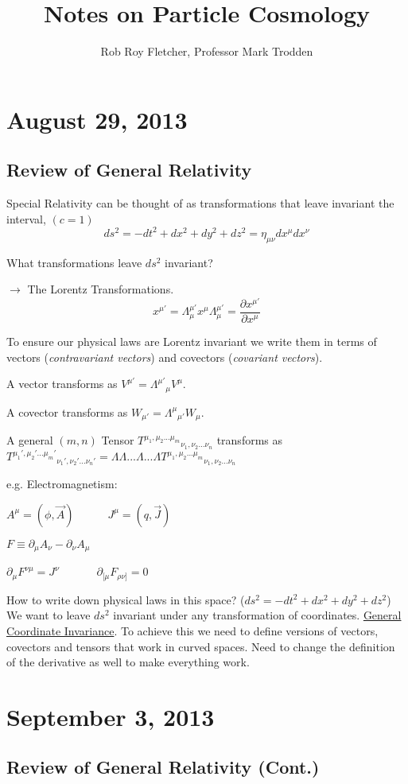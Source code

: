\documentclass{article}
\title{Notes on Particle Cosmology}
\author{Rob Roy Fletcher, Professor Mark Trodden}
\numberwithin{equation}{section}
\newcommand{\dmu}{\partial_{\mu}}
\newcommand{\mnk}{\eta_{\mu \nu}}  %
\newcommand{\beq}{\begin{equation}}
\newcommand{\eeq}{\end{equation}}
\begin{document}
\maketitle
\section{August 29, 2013}
\subsection{Review of General Relativity}

Special Relativity can be thought of as transformations that leave invariant the interval,      $(c=1)$
\beq
    ds^2 = -dt^2 + dx^2 + dy^2 + dz^2
    = \mnk dx^\mu dx^\nu
\eeq

What transformations leave $ds^2$ invariant?

$\longrightarrow$   The Lorentz Transformations.
\beq
    x^{\mu'} = \Lambda^{\mu'}_{\mu} x^\mu
    \Lambda^{\mu'}_{\mu} = \frac{\partial x^{\mu'}}{\partial x^{\mu}}
\eeq

To ensure our physical laws are Lorentz invariant we write them in terms of vectors ({\it contravariant vectors}) and covectors ({\it covariant vectors}).

A vector transforms as $V^{\mu'} = {\Lambda^{\mu'}}_{\mu} V^\mu$.

A covector transforms as $W_{\mu'} = {\Lambda^{\mu}}_{\mu'} W_\mu$.

A general $(m,n)$ Tensor ${T^{\mu_{1},\mu_{2}...\mu_{m}}}_{\nu_{1},\nu_{2}...\nu_{n}}$ transforms as
${T^{\mu_{1}',\mu_{2}'...\mu_{m}'}}_{\nu_{1}',\nu_{2}'...\nu_{n}'} =\Lambda \Lambda ... \Lambda ... \Lambda {T^{\mu_{1},\mu_{2}...\mu_{m}}}_{\nu_{1},\nu_{2}...\nu_{n}}$

e.g. Electromagnetism:

\begin{centering}
$A^\mu = (\phi, \vec{A})$\ \ \ \ \ \ $J^\mu = (q, \vec{J})$

$F\equiv \dmu A_\nu - \partial_{\nu} A_\mu$

$\dmu F^{\nu \mu} = J^\nu$  \ \ \ \ \ \ $\partial_{[\mu} F_{\rho \nu ]} = 0$ 

\end{centering}



How to write down physical laws in this space? ($ds^2 = -dt^2 + dx^2 + dy^2 + dz^2$)
We want to leave $ds^2$ invariant under any transformation of coordinates. \underline{General Coordinate Invariance}. To achieve this
we need to define versions of vectors, covectors and tensors that work in curved spaces. Need to change the definition of the derivative
as well to make everything work.

\section{September 3, 2013}
\subsection{Review of General Relativity (Cont.)}
\end{document}
